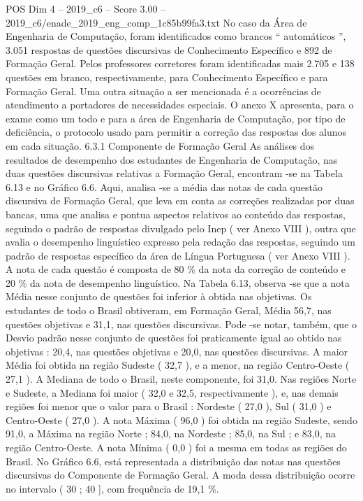\begin{textsample}{POS Dim 4 – 2019\_c6 – Score 3.00 – 2019\_c6/enade\_2019\_eng\_comp\_1c85b99fa3.txt}
No caso da Área de Engenharia de Computação, foram identificados como brancos “ automáticos ”, 3.051 respostas de questões discursivas de Conhecimento Específico e 892 de Formação Geral.
Pelos professores corretores foram identificadas mais 2.705 e 138 questões em branco, respectivamente, para Conhecimento Específico e para Formação Geral.
Uma outra situação a ser mencionada é a ocorrências de atendimento a portadores de necessidades especiais.
O anexo X apresenta, para o exame como um todo e para a área de Engenharia de Computação, por tipo de deficiência, o protocolo usado para permitir a correção das respostas dos alunos em cada situação. 6.3.1 Componente de Formação Geral As análises dos resultados de desempenho dos estudantes de Engenharia de Computação, nas duas questões discursivas relativas a Formação Geral, encontram -se na Tabela 6.13 e no Gráfico 6.6.
Aqui, analisa -se a média das notas de cada questão discursiva de Formação Geral, que leva em conta as correções realizadas por duas bancas, uma que analisa e pontua aspectos relativos ao conteúdo das respostas, seguindo o padrão de respostas divulgado pelo Inep ( ver Anexo VIII ), outra que avalia o desempenho linguístico expresso pela redação das respostas, seguindo um padrão de respostas específico da área de Língua Portuguesa ( ver Anexo VIII ).
A nota de cada questão é composta de 80 \% da nota da correção de conteúdo e 20 \% da nota de desempenho linguístico.
Na Tabela 6.13, observa -se que a nota Média nesse conjunto de questões foi inferior à obtida nas objetivas.
Os estudantes de todo o Brasil obtiveram, em Formação Geral, Média 56,7, nas questões objetivas e 31,1, nas questões discursivas.
Pode -se notar, também, que o Desvio padrão nesse conjunto de questões foi praticamente igual ao obtido nas objetivas : 20,4, nas questões objetivas e 20,0, nas questões discursivas.
A maior Média foi obtida na região Sudeste ( 32,7 ), e a menor, na região Centro-Oeste ( 27,1 ).
A Mediana de todo o Brasil, neste componente, foi 31,0.
Nas regiões Norte e Sudeste, a Mediana foi maior ( 32,0 e 32,5, respectivamente ), e, nas demais regiões foi menor que o valor para o Brasil : Nordeste ( 27,0 ), Sul ( 31,0 ) e Centro-Oeste ( 27,0 ).
A nota Máxima ( 96,0 ) foi obtida na região Sudeste, sendo 91,0, a Máxima na região Norte ; 84,0, na Nordeste ; 85,0, na Sul ; e 83,0, na região Centro-Oeste.
A nota Mínima ( 0,0 ) foi a mesma em todas as regiões do Brasil.
No Gráfico 6.6, está representada a distribuição das notas nas questões discursivas do Componente de Formação Geral.
A moda dessa distribuição ocorre no intervalo ( 30 ; 40 ], com frequência de 19,1 \%.

\end{textsample}
